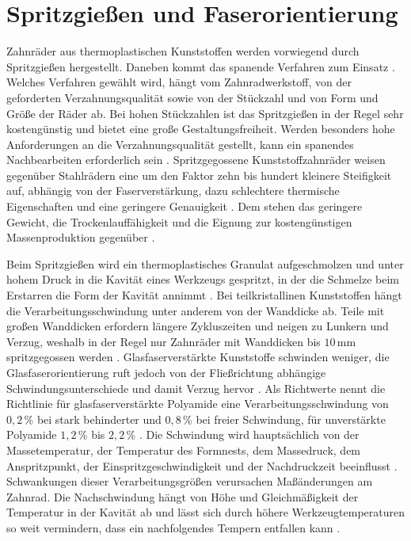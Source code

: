 \section{Spritzgießen und Faserorientierung}
\label{sec:spritzgiessen}

Zahnräder aus thermoplastischen Kunststoffen werden vorwiegend durch Spritzgießen hergestellt. Daneben kommt das spanende Verfahren zum Einsatz \cite[S.~25]{VDI2736-1}. Welches Verfahren gewählt wird, hängt vom Zahnradwerkstoff, von der geforderten Verzahnungsqualität sowie von der Stückzahl und von Form und Größe der Räder ab. Bei hohen Stückzahlen ist das Spritzgießen in der Regel sehr kostengünstig und bietet eine große Gestaltungsfreiheit. Werden besonders hohe Anforderungen an die Verzahnungsqualität gestellt, kann ein spanendes Nachbearbeiten erforderlich sein \cite[S.~25]{VDI2736-1}. Spritzgegossene Kunststoffzahnräder weisen gegenüber Stahlrädern eine um den Faktor zehn bis hundert kleinere Steifigkeit auf, abhängig von der Faserverstärkung, dazu schlechtere thermische Eigenschaften und eine geringere Genauigkeit \cite[S.~1]{FVA856-I}. Dem stehen das geringere Gewicht, die Trockenlauffähigkeit und die Eignung zur kostengünstigen Massenproduktion gegenüber \cite[S.~1]{FVA856-I}.

Beim Spritzgießen wird ein thermoplastisches Granulat aufgeschmolzen und unter hohem Druck in die Kavität eines Werkzeugs gespritzt, in der die Schmelze beim Erstarren die Form der Kavität annimmt \cite[S.~25]{VDI2736-1}. Bei teilkristallinen Kunststoffen hängt die Verarbeitungsschwindung unter anderem von der Wanddicke ab. Teile mit großen Wanddicken erfordern längere Zykluszeiten und neigen zu Lunkern und Verzug, weshalb in der Regel nur Zahnräder mit Wanddicken bis $10$\,mm spritzgegossen werden \cite[S.~25]{VDI2736-1}. Glasfaserverstärkte Kunststoffe schwinden weniger, die Glasfaserorientierung ruft jedoch von der Fließrichtung abhängige Schwindungsunterschiede und damit Verzug hervor \cite[S.~25]{VDI2736-1}. Als Richtwerte nennt die Richtlinie für glasfaserverstärkte Polyamide eine Verarbeitungsschwindung von $0{,}2$\,\% bei stark behinderter und $0{,}8$\,\% bei freier Schwindung, für unverstärkte Polyamide $1{,}2$\,\% bis $2{,}2$\,\% \cite[S.~26]{VDI2736-1}. Die Schwindung wird hauptsächlich von der Massetemperatur, der Temperatur des Formnests, dem Massedruck, dem Anspritzpunkt, der Einspritzgeschwindigkeit und der Nachdruckzeit beeinflusst \cite[S.~26]{VDI2736-1}. Schwankungen dieser Verarbeitungsgrößen verursachen Maßänderungen am Zahnrad. Die Nachschwindung hängt von Höhe und Gleichmäßigkeit der Temperatur in der Kavität ab und lässt sich durch höhere Werkzeugtemperaturen so weit vermindern, dass ein nachfolgendes Tempern entfallen kann \cite[S.~26 f.]{VDI2736-1}.

